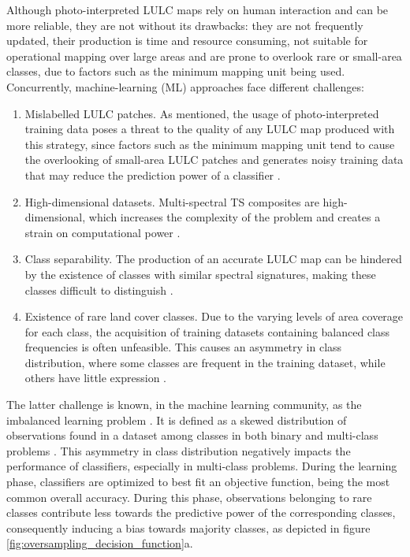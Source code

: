 \documentclass[parskip=full]{scrartcl}
\begin{document}
Although photo-interpreted LULC maps rely on human interaction and can be more
reliable, they are not without its drawbacks: they are not frequently updated,
their production is time and resource consuming, not suitable for operational
mapping over large areas and are prone to overlook rare or small-area classes,
due to factors such as the minimum mapping unit being used. Concurrently,
machine-learning (ML) approaches face different challenges:
\begin{enumerate}
	\item Mislabelled LULC patches. As mentioned, the usage of photo-interpreted training
	      data poses a threat to the quality of any LULC map produced with this strategy,
	      since factors such as the minimum mapping unit tend to cause the overlooking of
	      small-area LULC patches and generates noisy training data that may reduce the
	      prediction power of a classifier \cite{Pelletier2017}.
	\item High-dimensional datasets. Multi-spectral TS composites are high-dimensional,
	      which increases the complexity of the problem and creates a strain on
	      computational power \cite{Stromann2020}.
	\item Class separability. The production of an accurate LULC map can be hindered by
	      the existence of classes with similar spectral signatures, making these classes
	      difficult to distinguish \cite{Alonso-Sarria2019}.
	\item Existence of rare land cover classes. Due to the varying levels of area
	      coverage for each class, the acquisition of training datasets containing
	      balanced class frequencies is often unfeasible. This causes an asymmetry in
	      class distribution, where some classes are frequent in the training dataset,
	      while others have little expression \cite{Wang2019, Feng2019}.
\end{enumerate}


The latter challenge is known, in the machine learning community, as the
imbalanced learning problem \cite{Chawla2004}. It is defined as a skewed
distribution of observations found in a dataset among classes in both binary
and multi-class problems \cite{Abdi2016}. This asymmetry in class
distribution negatively impacts the performance of classifiers, especially in
multi-class problems. During the learning phase, classifiers are optimized to
best fit an objective function, being the most common overall accuracy. During
this phase, observations belonging to rare classes contribute less towards the
predictive power of the corresponding classes, consequently inducing a bias
towards majority classes, as depicted in figure \ref{fig:oversampling_decision_function}a.
\end{document}
